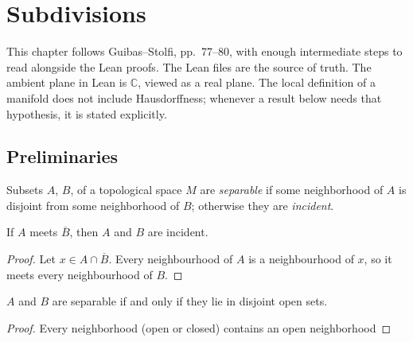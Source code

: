 \chapter{Subdivisions}

This chapter follows Guibas--Stolfi, pp.~77--80, with enough intermediate
steps to read alongside the Lean proofs. The Lean files are the source of truth.
The ambient plane in Lean is $\mathbb C$, viewed as a real plane.
The local definition of a manifold does not include Hausdorffness; whenever a
result below needs that hypothesis, it is stated explicitly.

  \section{Preliminaries}

    \begin{definition}\label{def:separable}
      \leanok
      Subsets $A$, $B$, of a topological space $M$ are \emph{separable} if some
      neighborhood of $A$ is disjoint from some neighborhood of $B$; otherwise
      they are \emph{incident}.
    \end{definition}

    \begin{lemma}\label{lem:incident-of-closure}
      \leanok
      If $A$ meets $\overline{B}$, then $A$ and $B$ are incident.
    \end{lemma}
    \begin{proof}
      \leanok
      Let $x \in A \cap \overline{B}$. Every neighbourhood of $A$ is a
      neighbourhood of $x$, so it meets every neighbourhood of $B$.
    \end{proof}

    \begin{lemma}\label{lem:separable-iff}

      $A$ and $B$ are separable if and only if they lie in disjoint open sets.
    \end{lemma}
    \begin{proof}

      Every neighborhood (open or closed) contains an open neighborhood
    \end{proof}

